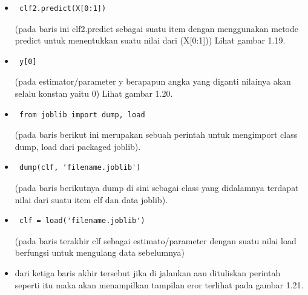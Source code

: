 \begin{itemize}
\item\begin{verbatim} clf2.predict(X[0:1])\end{verbatim}(pada baris ini clf2.predict sebagai suatu item dengan menggunakan metode predict untuk menentukkan suatu nilai dari (X[0:1])) Lihat gambar 1.19.
\item\begin{verbatim} y[0]\end{verbatim}(pada estimator/parameter y berapapun angka yang diganti nilainya akan selalu konstan yaitu 0) Lihat gambar 1.20. 
\item\begin{verbatim} from joblib import dump, load\end{verbatim}(pada baris berikut ini merupakan sebuah perintah untuk mengimport class dump, load dari packaged joblib).
\item\begin{verbatim} dump(clf, 'filename.joblib')\end{verbatim}(pada baris berikutnya dump di sini sebagai class yang didalamnya terdapat nilai dari suatu item clf dan data joblib).
\item\begin{verbatim} clf = load('filename.joblib')\end{verbatim}(pada baris terakhir clf sebagai estimato/parameter dengan suatu nilai load berfungsi untuk mengulang data sebelumnya)
\item dari ketiga baris akhir tersebut jika di jalankan aau dituliskan perintah seperti itu maka akan menampilkan tampilan eror terlihat pada gambar 1.21.
\end{itemize}
